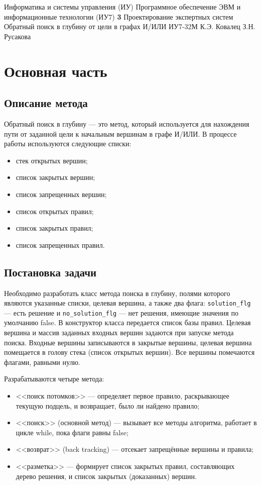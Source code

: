 \documentclass{bmstu}
\begin{document}
\makereporttitle
{Информатика и системы управления (ИУ)}
{Программное обеспечение ЭВМ и информационные технологии (ИУ7)}
{\textbf{3}}
{Проектирование экспертных систем}
{Обратный поиск в глубину от цели в графах И/ИЛИ}
{}
{ИУ7-32М}
{К.Э. Ковалец}
{З.Н. Русакова}


\setcounter{page}{2}
\renewcommand{\contentsname}{Содержание} 
\tableofcontents


\chapter{Основная часть}

\section{Описание метода}

Обратный поиск в глубину --- это метод, который используется для нахождения пути от заданной цели к начальным
вершинам в графе И/ИЛИ. В процессе работы используются следующие списки:
\begin{itemize}
    \item стек открытых вершин;
    \item список закрытых вершин;
    \item список запрещенных вершин;
    \item список открытых правил;
    \item список закрытых правил;
    \item список запрещенных правил.
\end{itemize}

\section{Постановка задачи}

Необходимо разработать класс метода поиска в глубину, полями которого являются указанные списки, целевая вершина, а также два флага: \texttt{solution\_flg} --- есть решение и \texttt{no\_solution\_flg} --- нет решения, имеющие значения по умолчанию false. В конструктор класса передается список базы правил. Целевая вершина и массив заданных входных вершин задаются при запуске метода поиска. Входные вершины записываются в закрытые вершины, целевая вершина помещается в голову стека (список открытых вершин). Все вершины помечаются флагами, равными нулю.

Разрабатываются четыре метода:
\begin{itemize}
    \item <<поиск потомков>> --- определяет первое правило, раскрывающее текущую подцель, и возвращает, было ли найдено правило;
    \item <<поиск>> (основной метод) --- вызывает все методы алгоритма, работает в цикле while, пока флаги равны false;
    \item <<возврат>> (back tracking) --- отсекает запрещённые вершины и правила;
    \item <<разметка>> --- формирует список закрытых правил, составляющих дерево решения, и список закрытых (доказанных) вершин.
\end{itemize}
\end{document}
